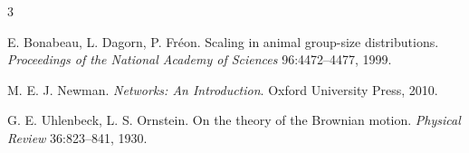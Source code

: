 \begin{thebibliography}{3}
\small

 E. Bonabeau, L. Dagorn, P. Fréon. Scaling in animal group-size distributions.
\emph{Proceedings of the National Academy of Sciences} 96:4472--4477, 1999.

 M. E. J. Newman. \emph{Networks: An Introduction}. Oxford University Press,
2010.

 G. E. Uhlenbeck, L. S. Ornstein. On the theory of the Brownian motion.
\emph{Physical Review} 36:823--841, 1930.

\end{thebibliography}
